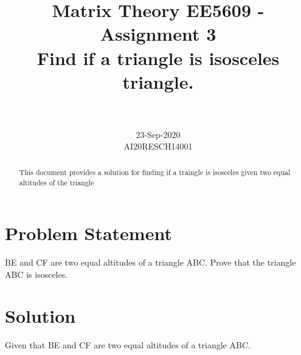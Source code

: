 \documentclass[journal,12pt,twocolumn]{IEEEtran}
\begin{document}
\title{Matrix Theory EE5609 - Assignment 3\\
Find if a triangle is isosceles triangle.
}

\author{\\
 \\
23-Sep-2020\\
AI20RESCH14001\\
 }

\maketitle
\begin{abstract}
This document provides a solution for finding if a traingle is isosceles given two equal altitudes of the triangle
\end{abstract}
%


\section{Problem Statement}
BE and CF are two equal altitudes of a triangle ABC. Prove that the triangle ABC is isosceles.


\section{Solution}
Given that BE and CF are two equal altitudes of a triangle ABC.

\captionsetup{justification=centering}
\end{document}
